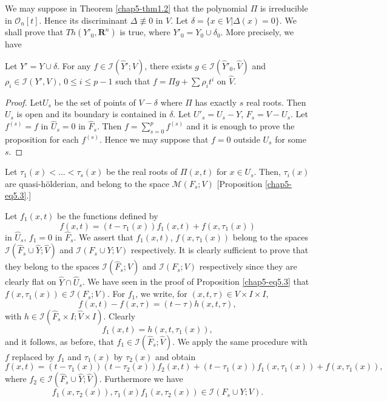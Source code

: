 We may suppose in Theorem \ref{chap5-thm1.2} that the polynomial $\Pi$ is irreducible in $\mathscr{O}_n [t]$. Hence its discriminant $\Delta \not\equiv 0$ in $V$. Let $\delta = \{x \in V | \Delta (x) = 0\}$. We shall prove that $Th (Y'_0, \mathbf{R}^n)$ is true, where $Y'_0 = Y_0 \cup \delta_0$. More precisely, we have

\begin{proposition}\label{chap5-prop2.1}
  Let $Y' = Y \cup \delta$. For any $f \in \mathscr{I} (\widehat{Y}' ; \widehat{V})$, there exists $g \in \mathscr{I} (\widehat{Y}'_0, \widehat{V})$  and $\rho_i \in \mathscr{I} (Y', V)$, $0 \leq i \leq p-1$ such that $f = \Pi g + \sum \rho_i t^i $ on $\widehat{V}$. 
\end{proposition}

\vfill\eject

\begin{proof}
Let\pageoriginale $U_s$ be the set of points of $V - \delta$ where $\Pi$ has exactly $s$ real roots. Then $U_s$ is open and its boundary is contained in $\delta$. Let $U'_s = U_s - Y$, $F_s = V - U_s$. Let $f^{(s)} = f$ in $\widehat{U}_s=0$ in $\widehat{F}_s$. Then  $f = \sum\limits^{p}_{s=0} f^{(s)}$ and it is enough to prove the proposition for each $f^{(s)}$. Hence we may suppose that $f =0$ outside $U_s$ for some $s$.
\end{proof}

Let $\tau_1 (x) < \ldots < \tau_s (x)$ be the real roots of $\Pi (x,t)$ for $x \in U_s$. Then, $\tau_i (x)$ are quasi-h\"olderian, and belong to the space $\mathscr{M} (F_s; V)$ [Proposition \ref{chap5-eq5.3}.]

Let $f_1 (x,t)$ be the functions defined by
$$
f(x, t) = (t - \tau_1 (x)) f_1 (x,t) + f (x, \tau_1 (x))
$$
in $\widehat{U}_s$, $f_1 =0$ in $\widehat{F}_s$. We assert that $f_1 (x,t)$, $f(x, \tau_1 (x))$ belong to the spaces $\mathscr{I} (\widehat{F}_s \cup \widehat{Y}; \widehat{V})$ and $\mathscr{I}(F_s \cup Y; V)$ respectively. It is clearly sufficient to prove that they belong to the spaces $\mathscr{I} (\widehat{F}_s; \widehat{V})$ and $\mathscr{I}(F_s; V)$  respectively since they are clearly flat on $\widehat{Y} \cap \widehat{U}_s$. We have seen in the proof of Proposition \ref{chap5-eq5.3} that $f(x, \tau_1 (x)) \in \mathscr{I} (F_s; V)$. For $f_1$, we write, for $(x, t, \tau) \in V \times I \times I$,
$$
 f(x, t) - f(x, \tau)  = ( t - \tau) h (x,t, \tau), 
$$
with $h \in \mathscr{I}(\widehat{F}_s \times I ; \widehat{V} \times I)$. Clearly
$$
f_1 (x, t) = h (x, t, \tau_1 (x)), 
$$
and it follows, as before, that $f_1 \in \mathscr{I} (\widehat{F}_s; \widehat{V})$. We apply the same procedure with $f$ replaced  by $f_1$ and  $\tau_1 (x)$ by $\tau_2 (x)$ and obtain
$$
 f(x,t) = (t - \tau_1 (x)) (t - \tau_2 (x)) f_2 (x,t) + (t - \tau_1 (x)) f_1 (x, \tau_1 (x)) + f(x, \tau_1 (x)),
$$
where $f_2 \in \mathscr{I} (\widehat{F}_s \cup \widehat{Y}; \widehat{V})$.  Furthermore we have
$$
 f_1 (x, \tau_2(x)), \tau_1 (x) f_1 (x, \tau_2 (x)) \in \mathscr{I} (F_s \cup Y; V).
 $$

